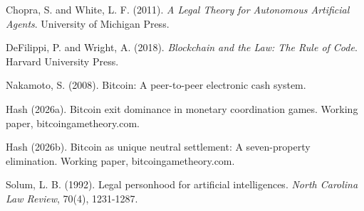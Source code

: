 \documentclass[12pt]{article}
\theoremstyle{definition}
\theoremstyle{remark}
\begin{document}
Chopra, S. and White, L. F. (2011). \emph{A Legal Theory for Autonomous
Artificial Agents}. University of Michigan Press.

DeFilippi, P. and Wright, A. (2018). \emph{Blockchain and the Law: The
Rule of Code}. Harvard University Press.

Nakamoto, S. (2008). Bitcoin: A peer-to-peer electronic cash system.

Hash (2026a). Bitcoin exit dominance in monetary coordination games.
Working paper, bitcoingametheory.com.

Hash (2026b). Bitcoin as unique neutral settlement: A seven-property
elimination. Working paper, bitcoingametheory.com.

Solum, L. B. (1992). Legal personhood for artificial intelligences.
\emph{North Carolina Law Review}, 70(4), 1231-1287.
\end{document}
